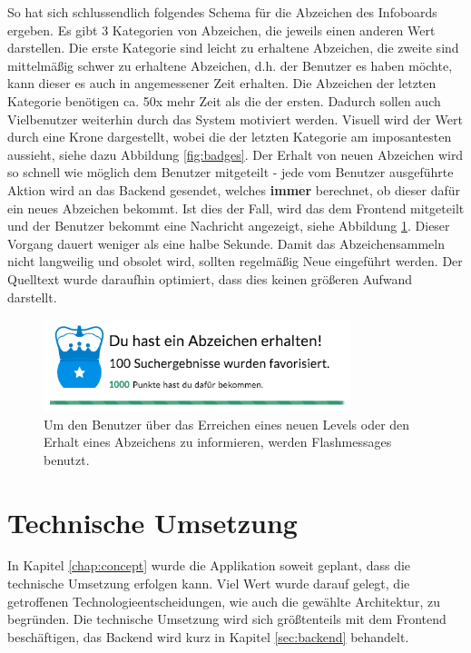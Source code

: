 \documentclass[12pt,twoside]{book}
\begin{document}
So hat sich schlussendlich folgendes Schema für die Abzeichen des Infoboards ergeben. Es gibt 3 Kategorien von Abzeichen, die jeweils einen anderen Wert darstellen. Die erste Kategorie sind leicht zu erhaltene Abzeichen, die zweite sind mittelmäßig schwer zu erhaltene Abzeichen, d.h. der Benutzer es haben möchte, kann dieser es auch in angemessener Zeit erhalten. Die Abzeichen der letzten Kategorie benötigen ca. 50x mehr Zeit als die der ersten. Dadurch sollen auch Vielbenutzer weiterhin durch das System motiviert werden. Visuell wird der Wert durch eine Krone dargestellt, wobei die der letzten Kategorie am imposantesten aussieht, siehe dazu Abbildung \ref{fig:badges}.
Der Erhalt von neuen Abzeichen wird so schnell wie möglich dem Benutzer mitgeteilt - jede vom Benutzer ausgeführte Aktion wird an das Backend gesendet, welches \textbf{immer} berechnet, ob dieser dafür ein neues Abzeichen bekommt. Ist dies der Fall, wird das dem Frontend mitgeteilt und der Benutzer bekommt eine Nachricht angezeigt, siehe Abbildung \ref{fig:flashmessage}. Dieser Vorgang dauert weniger als eine halbe Sekunde.
Damit das Abzeichensammeln nicht langweilig und obsolet wird, sollten regelmäßig Neue eingeführt werden. Der Quelltext wurde daraufhin optimiert, dass dies keinen größeren Aufwand darstellt.

\begin{figure}[htbp]
    \centering
    \includegraphics[width=0.8\textwidth]{images/infoboard_flashmessage.png}
    \caption{Um den Benutzer über das Erreichen eines neuen Levels oder den Erhalt eines Abzeichens zu informieren, werden Flashmessages benutzt.}
    \label{fig:flashmessage}
\end{figure}

\chapter{Technische Umsetzung}\label{chap:tech}

In Kapitel \ref{chap:concept} wurde die Applikation soweit geplant, dass die technische Umsetzung erfolgen kann. Viel Wert wurde darauf gelegt, die getroffenen Technologieentscheidungen, wie auch die gewählte Architektur, zu begründen.
Die technische Umsetzung wird sich größtenteils mit dem Frontend beschäftigen, das Backend wird kurz in Kapitel \ref{sec:backend} behandelt.
\end{document}
